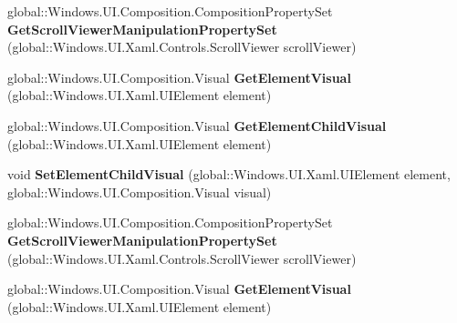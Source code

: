 \begin{DoxyCompactItemize}
global\+::\+Windows.\+U\+I.\+Composition.\+Composition\+Property\+Set {\bfseries Get\+Scroll\+Viewer\+Manipulation\+Property\+Set} (global\+::\+Windows.\+U\+I.\+Xaml.\+Controls.\+Scroll\+Viewer scroll\+Viewer)
\item 
\mbox{\label{interface_windows_1_1_u_i_1_1_xaml_1_1_hosting_1_1_i_element_composition_preview_statics_ae2b37785a6d7aebf56292ef6ef4b23c8}} 
global\+::\+Windows.\+U\+I.\+Composition.\+Visual {\bfseries Get\+Element\+Visual} (global\+::\+Windows.\+U\+I.\+Xaml.\+U\+I\+Element element)
\item 
\mbox{\label{interface_windows_1_1_u_i_1_1_xaml_1_1_hosting_1_1_i_element_composition_preview_statics_a5c60a91c9c5c8f2c885579f65b715542}} 
global\+::\+Windows.\+U\+I.\+Composition.\+Visual {\bfseries Get\+Element\+Child\+Visual} (global\+::\+Windows.\+U\+I.\+Xaml.\+U\+I\+Element element)
\item 
\mbox{\label{interface_windows_1_1_u_i_1_1_xaml_1_1_hosting_1_1_i_element_composition_preview_statics_ae6c5a85d72b3bb334c01c89b54803023}} 
void {\bfseries Set\+Element\+Child\+Visual} (global\+::\+Windows.\+U\+I.\+Xaml.\+U\+I\+Element element, global\+::\+Windows.\+U\+I.\+Composition.\+Visual visual)
\item 
\mbox{\label{interface_windows_1_1_u_i_1_1_xaml_1_1_hosting_1_1_i_element_composition_preview_statics_ab27d5dea22cc21e23a4eb65c45a18223}} 
global\+::\+Windows.\+U\+I.\+Composition.\+Composition\+Property\+Set {\bfseries Get\+Scroll\+Viewer\+Manipulation\+Property\+Set} (global\+::\+Windows.\+U\+I.\+Xaml.\+Controls.\+Scroll\+Viewer scroll\+Viewer)
\item 
\mbox{\label{interface_windows_1_1_u_i_1_1_xaml_1_1_hosting_1_1_i_element_composition_preview_statics_ae2b37785a6d7aebf56292ef6ef4b23c8}} 
global\+::\+Windows.\+U\+I.\+Composition.\+Visual {\bfseries Get\+Element\+Visual} (global\+::\+Windows.\+U\+I.\+Xaml.\+U\+I\+Element element)

\end{DoxyCompactItemize}
